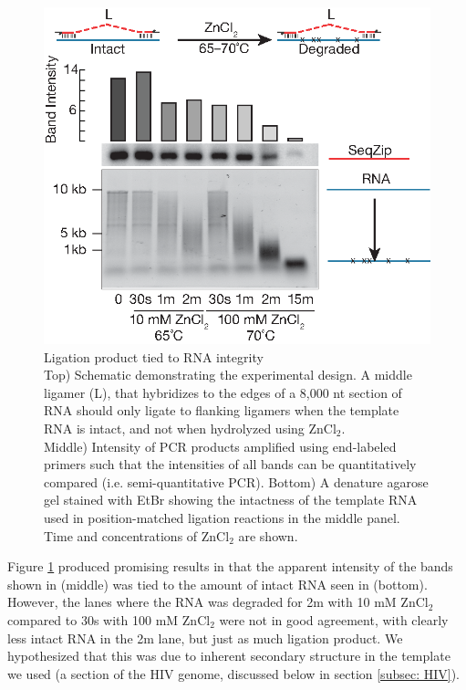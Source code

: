 	  \begin{figure} %
    	\centering 
    	\includegraphics{Figures/SeqZipMethod/DegreadedRNABySeqZip.eps}
    	\caption[Ligation product tied to RNA integrity]
    	{
		    Ligation product tied to RNA integrity\\[0.25cm]
      	Top) Schematic demonstrating the experimental design. A middle ligamer (L), that hybridizes to the edges of a 8,000 nt section of RNA should only ligate to flanking ligamers when the template RNA is intact, and not when hydrolyzed using ZnCl$_{2}$. \\
        Middle) Intensity of PCR products amplified using end-labeled primers such that the intensities of all bands can be quantitatively compared (i.e. semi-quantitative PCR). Bottom) A denature agarose gel stained with EtBr showing the intactness of the template RNA used in position-matched ligation reactions in the middle panel. Time and concentrations of ZnCl$_{2}$ are shown.
    		}
    	\label{SeqZipMethod:fig:Ligation product and RNA integrity}
  		\end{figure}

    Figure \ref{SeqZipMethod:fig:Ligation product and RNA integrity} produced promising results in that the apparent intensity of the bands shown in (middle) was tied to the amount of intact RNA seen in (bottom). However, the lanes where the RNA was degraded for 2m with 10 mM ZnCl$_{2}$ compared to 30s with 100 mM ZnCl$_{2}$ were not in good agreement, with clearly less intact RNA in the 2m lane, but just as much ligation product. We hypothesized that this was due to inherent secondary structure in the template we used (a section of the HIV genome, discussed below in section \ref{subsec: HIV}). 

